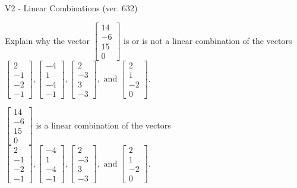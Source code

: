 \begin{exercise}
  \begin{exerciseTitle}V2 - Linear Combinations (ver. 632)\end{exerciseTitle}
  \begin{exerciseStatement}
    Explain why the vector \(\left[\begin{array}{c}
14 \\
-6 \\
15 \\
0
\end{array}\right]\)  is or is not a linear 
	combination of the vectors \(\left[\begin{array}{c}
2 \\
-1 \\
-2 \\
-1
\end{array}\right] , \left[\begin{array}{c}
-4 \\
1 \\
-4 \\
-1
\end{array}\right] , \left[\begin{array}{c}
2 \\
-3 \\
3 \\
-3
\end{array}\right] , \text{ and } \left[\begin{array}{c}
2 \\
1 \\
-2 \\
0
\end{array}\right]\).
	


  \end{exerciseStatement}
  \begin{exerciseAnswer}
   \(\left[\begin{array}{c}
14 \\
-6 \\
15 \\
0
\end{array}\right]\) 
  	 is  
	a linear combination of the vectors \(\left[\begin{array}{c}
2 \\
-1 \\
-2 \\
-1
\end{array}\right] , \left[\begin{array}{c}
-4 \\
1 \\
-4 \\
-1
\end{array}\right] , \left[\begin{array}{c}
2 \\
-3 \\
3 \\
-3
\end{array}\right] , \text{ and } \left[\begin{array}{c}
2 \\
1 \\
-2 \\
0
\end{array}\right]\).


\end{exerciseAnswer}
\end{exercise}
